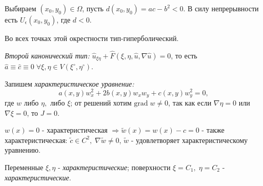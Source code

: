 Выбираем $(x_0, y_0) \in \Omega$, пусть $d(x_0, y_0) = ac - b^2 < 0$. В силу непрерывности есть $U_\epsilon(x_0, y_0)$, где $d < 0$.



Во всех точках этой окрестности тип-гиперболический. \\
\begin{definition}
\textit{Второй канонический тип:} $\hat{u}_{\xi\eta} + \hat{F}(\xi, \eta, \hat{u}, \nabla \hat{u}) = 0$, то есть $\hat{a} \equiv \hat{c} \equiv 0\; \forall \xi, \eta \in V(\xi^{\circ}, \eta^{\circ})$.
\end{definition}
Запишем \textit{характеристическое уравнение:}
\begin{equation*}
	a(x, y) w^{2}_x + 2b(x, y)w_x w_y + c(x, y)w_y^2  = 0, 
\end{equation*}
где $w$ либо $\eta,$ либо $\xi$; от решений хотим $\text{grad}\;w \neq 0$, так как если $\nabla \eta = 0$ или $\nabla \xi = 0$, то $J = 0$. \\
\begin{remark}
	$w(x) = 0$ - характеристическая $\Rightarrow \tilde{w}(x) =  w(x) - c = 0$ - также характеристическая: $\tilde{c} \in C^2,\; \nabla \tilde{w} \neq 0$, $\tilde{w}$ - удовлетворяет характеристическому уравнению.  \\
\end{remark}
\begin{definition}
Переменные $\xi, \eta$ - \textit{характеристические}; поверхности $\xi = C_1,\; \eta = C_2$ - \textit{характеристические}.
\end{definition} 
